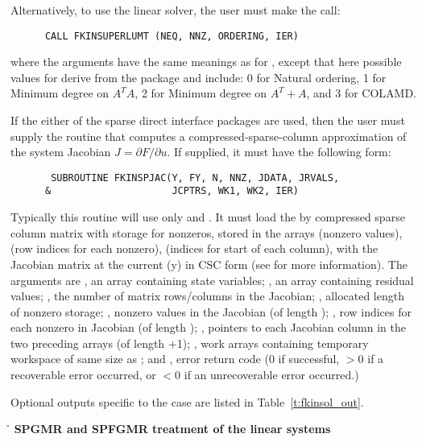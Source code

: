 \begin{Steps}
  Alternatively, to use the  linear solver,
  the user must make the call:
\begin{verbatim}
      CALL FKINSUPERLUMT (NEQ, NNZ, ORDERING, IER)
\end{verbatim}
  where the arguments have the same meanings as for , except
  that here possible values for  derive from the {\superlumt} 
  package and include: 0 for Natural ordering, 1 for Minimum degree on $A^T A$,
  2 for Minimum degree on $A^T + A$, and 3 for COLAMD.

  If the either of the sparse direct interface packages are used, 
  then the user must supply the  routine
  that computes a compressed-sparse-column 
  approximation of the system Jacobian $J = \partial F / \partial u$.
  If supplied, it must have the following form:
\begin{verbatim}
       SUBROUTINE FKINSPJAC(Y, FY, N, NNZ, JDATA, JRVALS, 
      &                     JCPTRS, WK1, WK2, IER)
\end{verbatim}
  Typically this routine will use only  and 
  . It must load the  by  
  compressed sparse column matrix 
  with storage for  nonzeros, stored in the arrays  (nonzero
  values),  (row indices for each nonzero),  (indices 
  for start of each column), with the Jacobian matrix at the current
  (y) in CSC form (see  for more information).
 The arguments are , an array containing state variables; , an
 array containing residual values; , the number of matrix rows/columns 
 in the Jacobian; , allocated length of nonzero storage; ,
 nonzero values in the Jacobian (of length ); 
 , row indices for each nonzero in Jacobian (of length );
 , pointers to each Jacobian column in the two preceding arrays
 (of length +1); , work arrays containing temporary workspace 
 of same size as ; and , error return code (0 if successful,
 $>0$ if a recoverable error occurred, or $<0$ if an unrecoverable error occurred.)

  Optional outputs specific to the {\sparse} case are listed in
  Table~\ref{t:fkinsol_out}.

  
  {\s}{\p}{\h} {\bf SPGMR and SPFGMR treatment of the linear systems}


\end{Steps}
